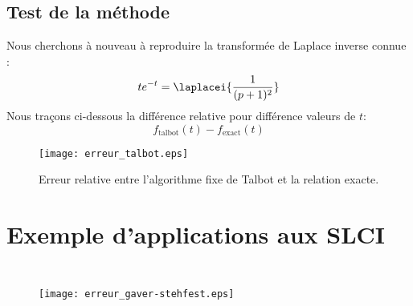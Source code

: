 \subsection*{Test de la méthode}
Nous cherchons à nouveau à reproduire la transformée de Laplace inverse connue :
\[
    te^{-t}=\laplacei{\dfrac{1}{(p+1)^2}}
\]
Nous traçons ci-dessous la différence relative pour différence valeurs de $t$:
\[
    f_{\textrm{talbot}}(t) - f_{\textrm{exact}}(t) 
\]
\begin{figure}[!b]
    \centering
    \texttt{[image: erreur\_talbot.eps]}
    \caption{Erreur relative entre l'algorithme fixe de Talbot et 
             la relation exacte.}
\end{figure}
\clearpage
\section{Exemple d'applications aux SLCI}

\inputminted{python}{codes/python/1er_ordre-annexe_invL.py}
\inputminted{python}{codes/python/2nd_ordre-annexe_invL.py}

\begin{figure}
    \centering
    \texttt{[image: erreur\_gaver-stehfest.eps]}
\end{figure}
